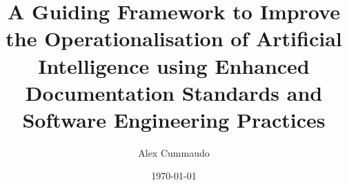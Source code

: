 \title{A Guiding Framework to Improve the Operationalisation of Artificial Intelligence  using Enhanced Documentation Standards and Software Engineering Practices}
\author{Alex Cummaudo}
\date{\today}

\def \thedegree {Doctor of Philosophy}
\def \thedepartment {Applied Artificial Intelligence Institute}
\def \theinstitution {Deakin University}
\def \thelocation {Melbourne, Australia}
\def \theauthorspostnominals {BSc \textit{Swinburne}, BIT(Hons)}